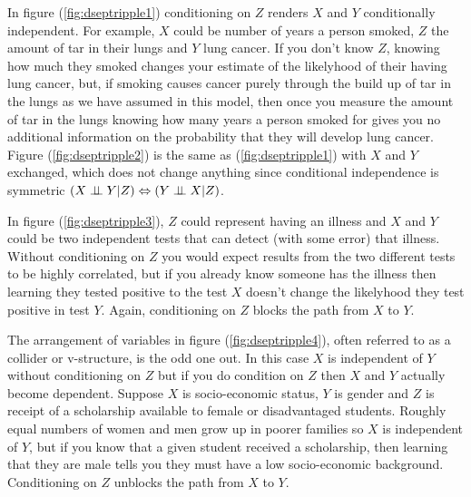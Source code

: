 \documentclass[11pt,a4paper]{article}
\begin{document}
In figure (\ref{fig:dseptripple1}) conditioning on $Z$ renders $X$ and $Y$ conditionally independent. For example, $X$ could be number of years a person smoked, $Z$ the amount of tar in their lungs and $Y$ lung cancer. If you don't know $Z$, knowing how much they smoked changes your estimate of the likelyhood of their having lung cancer, but, if smoking causes cancer purely through the build up of tar in the lungs as we have assumed in this model, then once you measure the amount of tar in the lungs knowing how many years a person smoked for gives you no additional information on the probability that they will develop lung cancer. Figure (\ref{fig:dseptripple2}) is the same as (\ref{fig:dseptripple1}) with $X$ and $Y$ exchanged, which does not change anything since conditional independence is symmetric $(X \perp\!\!\!\perp Y|Z) \Leftrightarrow (Y \perp\!\!\!\perp X|Z)$.

In figure (\ref{fig:dseptripple3}), $Z$ could represent having an illness and $X$ and $Y$ could be two independent tests that can detect (with some error) that illness. Without conditioning on $Z$ you would expect results from the two different tests to be highly correlated, but if you already know someone has the illness then learning they tested positive to the test $X$ doesn't change the likelyhood they test positive in test $Y$. Again, conditioning on $Z$ blocks the path from $X$ to $Y$.

The arrangement of variables in figure (\ref{fig:dseptripple4}), often referred to as a collider or v-structure, is the odd one out. In this case $X$ is independent of $Y$ without conditioning on $Z$ but if you do condition on $Z$ then $X$ and $Y$ actually become dependent. Suppose $X$ is socio-economic status, $Y$ is gender and $Z$ is receipt of a scholarship available to female or disadvantaged students. Roughly equal numbers of women and men grow up in poorer families so $X$ is independent of $Y$, but if you know that a given student received a scholarship, then learning that they are male tells you they must have a low socio-economic background. Conditioning on $Z$ unblocks the path from $X$ to $Y$. 
\end{document}
